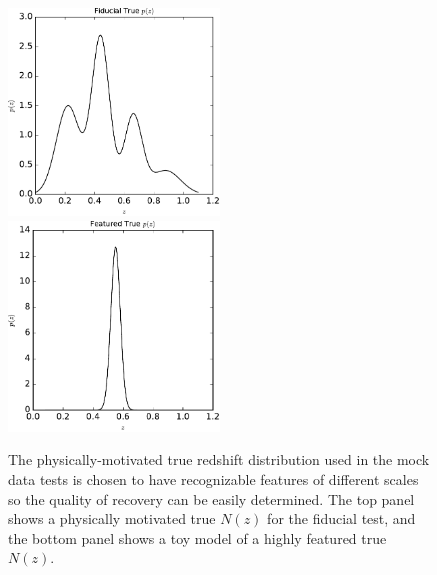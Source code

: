 \documentclass[preprint]{aastex}
\begin{document}
\begin{figure}
\includegraphics[width=0.5\textwidth]{figs/sig2/physPz.pdf}\\
\includegraphics[width=0.5\textwidth]{figs/delt/physPz.pdf}
\caption{The physically-motivated true redshift distribution used in the mock 
data tests is chosen to have recognizable features of different scales so the 
quality of recovery can be easily determined.  The top panel shows a physically 
motivated true $N(z)$ for the fiducial test, and the bottom panel shows a toy 
model of a highly featured true $N(z)$.}
\label{fig:physpz}
\end{figure}
\end{document}
